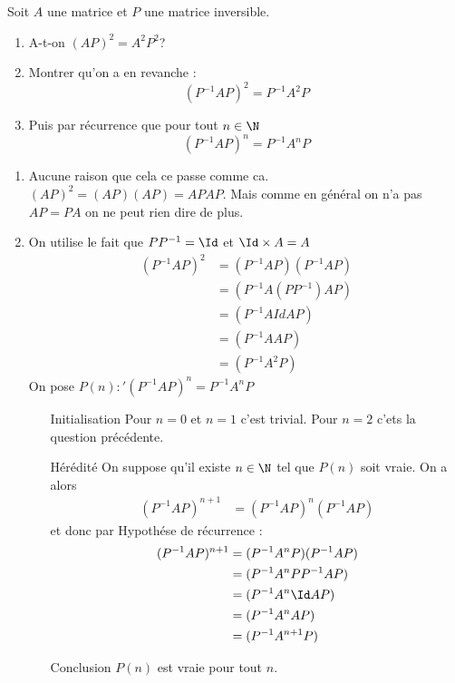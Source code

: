\documentclass[a4paper, 11pt,reqno]{article}
\begin{document}
\begin{exercice}
Soit $A$ une matrice et $P$ une matrice inversible. 
\begin{enumerate}
\item A-t-on $(AP)^2 =A^2 P^2 $?
\item Montrer qu'on a en revanche : 
$$(P^{-1}A P )^2 =P^{-1} A^2 P$$
\item Puis par récurrence  que  pour tout $n\in \N$
$$(P^{-1}A P )^n =P^{-1} A^n P$$
\end{enumerate}
\end{exercice}

\begin{correction}
\begin{enumerate}
\item Aucune raison que cela ce passe comme ca.  $(AP)^2 = (AP)(AP) =APAP$. Mais comme en général on n'a pas $AP=PA$ on ne peut rien dire de plus. 

\item On utilise le fait que $PP^{-1} = \Id$ et $\Id \times A = A$ 
\begin{align*}
(P^{-1}A P )^2& =(P^{-1}A P )(P^{-1}A P ) \\
						&= (P^{-1}A (P P^{-1})A P ) \\
						&= (P^{-1}A Id A P ) \\
						&= (P^{-1}A A P ) \\
						&= (P^{-1}A^2 P ) 					
\end{align*}
On pose $P(n) : ' (P^{-1}A P )^n =P^{-1} A^n P$
\begin{itemize}
\item[Initialisation]  Pour $n=0$ et $n=1$ c'est trivial. Pour $n=2$ c'ets la question précédente. 

\item[Hérédité] On suppose qu'il existe $n\in \N$ tel que $P(n)$ soit vraie. 
On a alors 
\begin{align*}
 (P^{-1}A P )^{n+1}&=  (P^{-1}A P )^n  (P^{-1}A P )
\end{align*}
et donc par Hypothése de récurrence : 
\begin{align*}
 (P^{-1}A P )^{n+1}&=  (P^{-1}A^n P )  (P^{-1}A P )\\
 							&=  (P^{-1}A^n P  P^{-1}A P )\\
 							&=  (P^{-1}A^n \Id A P )\\
 							&=  (P^{-1}A^n A P )\\
 							&=  (P^{-1}A^{n+1} P )
\end{align*}
\item[Conclusion] $P(n)$ est vraie pour tout $n$. 

\end{itemize}


\end{enumerate}
\end{correction}
\end{document}
